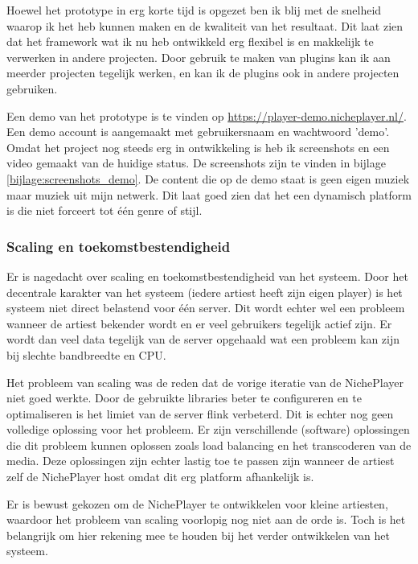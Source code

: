 Hoewel het prototype in erg korte tijd is opgezet ben ik blij met de snelheid waarop ik het heb kunnen maken en de kwaliteit van het resultaat. Dit laat zien dat het framework wat ik nu heb ontwikkeld erg flexibel is en makkelijk te verwerken in andere projecten. Door gebruik te maken van plugins kan ik aan meerder projecten tegelijk werken, en kan ik de plugins ook in andere projecten gebruiken.

Een demo van het prototype is te vinden op \url{https://player-demo.nicheplayer.nl/}. Een demo account is aangemaakt met gebruikersnaam en wachtwoord 'demo'. Omdat het project nog steeds erg in ontwikkeling is heb ik screenshots en een video gemaakt van de huidige status. De screenshots zijn te vinden in bijlage \ref{bijlage:screenshots_demo}. De content die op de demo staat is geen eigen muziek maar muziek uit mijn netwerk. Dit laat goed zien dat het een dynamisch platform is die niet forceert tot één genre of stijl.

\subsubsection*{Scaling en toekomstbestendigheid}
Er is nagedacht over scaling en toekomstbestendigheid van het systeem. Door het decentrale karakter van het systeem (iedere artiest heeft zijn eigen player) is het systeem niet direct belastend voor één server. Dit wordt echter wel een probleem wanneer de artiest bekender wordt en er veel gebruikers tegelijk actief zijn. Er wordt dan veel data tegelijk van de server opgehaald wat een probleem kan zijn bij slechte bandbreedte en CPU.

Het probleem van scaling was de reden dat de vorige iteratie van de NichePlayer niet goed werkte. Door de gebruikte libraries beter te configureren en te optimaliseren is het limiet van de server flink verbeterd. Dit is echter nog geen volledige oplossing voor het probleem. Er zijn verschillende (software) oplossingen die dit probleem kunnen oplossen zoals load balancing en het transcoderen van de media. Deze oplossingen zijn echter lastig toe te passen zijn wanneer de artiest zelf de NichePlayer host omdat dit erg platform afhankelijk is. 

Er is bewust gekozen om de NichePlayer te ontwikkelen voor kleine artiesten, waardoor het probleem van scaling voorlopig nog niet aan de orde is. Toch is het belangrijk om hier rekening mee te houden bij het verder ontwikkelen van het systeem.

